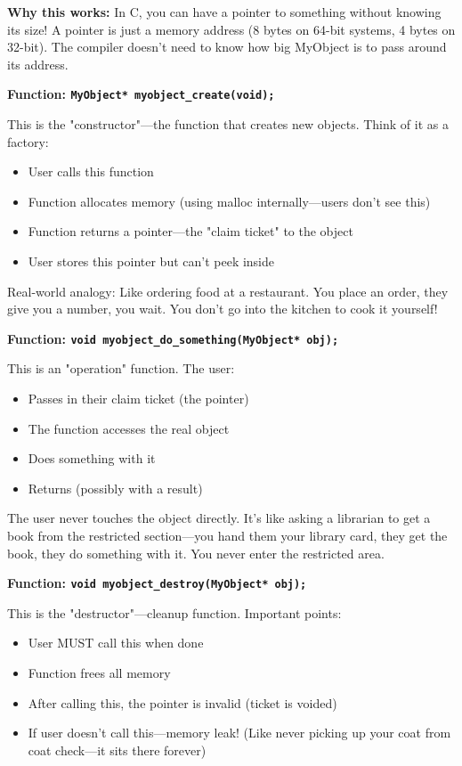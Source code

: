 \textbf{Why this works:} In C, you can have a pointer to something without knowing its size! A pointer is just a memory address (8 bytes on 64-bit systems, 4 bytes on 32-bit). The compiler doesn't need to know how big MyObject is to pass around its address.

\textbf{Function: \texttt{MyObject* myobject\_create(void);}}

This is the "constructor"---the function that creates new objects. Think of it as a factory:

\begin{itemize}
    \item User calls this function
    \item Function allocates memory (using malloc internally---users don't see this)
    \item Function returns a pointer---the "claim ticket" to the object
    \item User stores this pointer but can't peek inside
\end{itemize}

Real-world analogy: Like ordering food at a restaurant. You place an order, they give you a number, you wait. You don't go into the kitchen to cook it yourself!

\textbf{Function: \texttt{void myobject\_do\_something(MyObject* obj);}}

This is an "operation" function. The user:

\begin{itemize}
    \item Passes in their claim ticket (the pointer)
    \item The function accesses the real object
    \item Does something with it
    \item Returns (possibly with a result)
\end{itemize}

The user never touches the object directly. It's like asking a librarian to get a book from the restricted section---you hand them your library card, they get the book, they do something with it. You never enter the restricted area.

\textbf{Function: \texttt{void myobject\_destroy(MyObject* obj);}}

This is the "destructor"---cleanup function. Important points:

\begin{itemize}
    \item User MUST call this when done
    \item Function frees all memory
    \item After calling this, the pointer is invalid (ticket is voided)
    \item If user doesn't call this---memory leak! (Like never picking up your coat from coat check---it sits there forever)
\end{itemize}

